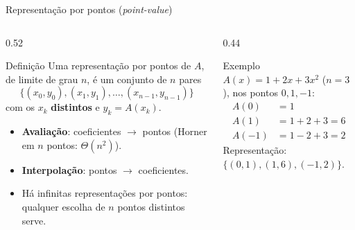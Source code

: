 \documentclass[aspectratio=169,10pt]{beamer}
\begin{document}
\begin{frame}{Representação por pontos (\textit{point-value})}
  \begin{columns}[T]
    \begin{column}{0.52\textwidth}
      \begin{block}{Definição}
        Uma representação por pontos de $A$, de limite de grau $n$, é um conjunto de
        $n$ pares
        \[
          \{(x_0,y_0),(x_1,y_1),\dots,(x_{n-1},y_{n-1})\}
        \]
        com os $x_k$ \textbf{distintos} e $y_k = A(x_k)$.
      \end{block}
      \begin{itemize}
        \item \textbf{Avaliação}: coeficientes $\to$ pontos (Horner em $n$ pontos: $\Theta(n^2)$).
        \item \textbf{Interpolação}: pontos $\to$ coeficientes.
        \item Há infinitas representações por pontos: qualquer escolha de $n$ pontos distintos serve.
      \end{itemize}
    \end{column}
    \begin{column}{0.44\textwidth}
      \begin{exampleblock}{Exemplo}
        $A(x) = 1 + 2x + 3x^2$ ($n=3$), nos pontos $0, 1, -1$:
        \begin{align*}
          A(0)  &= 1\\
          A(1)  &= 1+2+3 = 6\\
          A(-1) &= 1-2+3 = 2
        \end{align*}
        Representação: $\{(0,1),(1,6),(-1,2)\}$.
      \end{exampleblock}
      \centering
    \end{column}
  \end{columns}
\end{frame}
\end{document}
